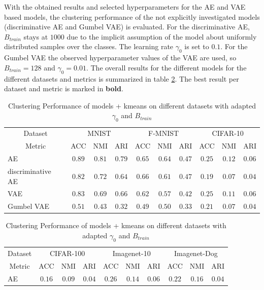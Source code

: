 \documentclass[12pt,DIV14,BCOR12mm,a4paper,footexclude,headinclude,halfparskip-,twoside,openright,cleardoubleempty,idxtotoc,bibtotoc,listtotoc]{scrreprt} %
\numberwithin{equation}{chapter}
\begin{document}
With the obtained results and selected hyperparameters for the AE and VAE based models, the clustering performance of the not explicitly investigated models (discriminative AE and Gumbel VAE) is evaluated. For the discriminative AE, $B_{train}$ stays at $1000$ due to the implicit assumption of the model about uniformly distributed samples over the classes. The learning rate $\gamma_0$ is set to $0.1$. For the Gumbel VAE the observed hyperparameter values of the VAE are used, so $B_{train}=128$ and $\gamma_0=0.01$. The overall results for the different models for the different datasets and metrics is summarized in table \ref{tab:ClusterPerformance_Models_initLR_BatchSize}. The best result per dataset and metric is marked in \textbf{bold}.
	\begin{table}[htb!]
    		\centering
    		\caption{Clustering Performance of models + kmeans on different datasets with adapted $\gamma_0$ and $B_{train}$}
    		\label{tab:ClusterPerformance_Models_initLR_BatchSize}
    		\begin{tabular}{l|ccccccccc}
    			\toprule
    			\multicolumn{1}{c}{Dataset} & \multicolumn{3}{c}{MNIST} & \multicolumn{3}{c}{F-MNIST} & \multicolumn{3}{c}{CIFAR-10}\\
        		\multicolumn{1}{c}{Metric} & ACC & NMI & ARI & ACC & NMI & ARI & ACC & NMI & ARI\\
        		\midrule
    			AE & $\mathbf{0.89}$ & $\mathbf{0.81}$ & $\mathbf{0.79}$ & $0.65$ & $\mathbf{0.64}$ & $\mathbf{0.47}$ & $\mathbf{0.25}$ & $\mathbf{0.12}$ & $\mathbf{0.06}$\\
        		discriminative AE & $0.82$ & $0.72$ & $0.64$ & $\mathbf{0.66}$ & $0.61$ & $\mathbf{0.47}$ & $0.19$ & $0.07$ & $0.04$\\
        		VAE & $0.83$ & $0.69$ & $0.66$ & $0.62$ & $0.57$ & $0.42$ & $\mathbf{0.25}$ & $0.11$ & $\mathbf{0.06}$\\
        		Gumbel VAE & $0.51$ & $0.43$ & $0.32$ & $0.49$ & $0.50$ & $0.33$ & $0.21$ & $0.07$ & $0.04$\\
        		\bottomrule
    		\end{tabular}    		
    		\begin{tabular}{l|ccccccccc}
    			\toprule
    			\multicolumn{1}{c}{Dataset} & \multicolumn{3}{c}{CIFAR-100} & \multicolumn{3}{c}{Imagenet-10} & \multicolumn{3}{c}{Imagenet-Dog}\\
        		\multicolumn{1}{c}{Metric} & ACC & NMI & ARI & ACC & NMI & ARI & ACC & NMI & ARI\\
        		\midrule
    			AE & $\mathbf{0.16}$ & $\mathbf{0.09}$ & $\mathbf{0.04}$ & $0.26$ & $0.14$ & $0.06$ & $\mathbf{0.22}$ & $\mathbf{0.16}$ & $0.04$\\

\end{tabular}
\end{table}
\end{document}
